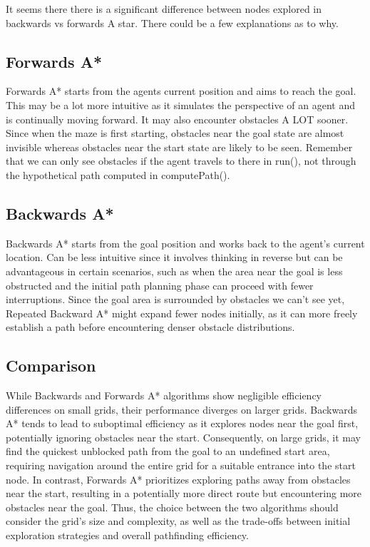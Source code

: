 \documentclass{article}
\begin{document}
It seems there there is a significant difference between nodes explored in backwards vs forwards A star. There could be a few explanations as to why. 
\subsection{Forwards A*}
Forwards A* starts from the agents current position and aims to reach the goal. This may be a lot more intuitive as it simulates the perspective of an agent and is continually moving forward. It may also encounter obstacles A LOT sooner. Since when the maze is first starting, obstacles near the goal state are almost invisible whereas obstacles near the start state are likely to be seen. Remember that we can only see obstacles if the agent travels to there in run(), not through the hypothetical path computed in computePath(). 

\subsection{Backwards A*}
Backwards A* starts from the goal position and works back to the agent's current location. Can be less intuitive since it involves thinking in reverse but can be advantageous in certain scenarios, such as when the area near the goal is less obstructed and the initial path planning phase can proceed with fewer interruptions. Since the goal area is surrounded by obstacles we can't see yet, Repeated Backward A* might expand fewer nodes initially, as it can more freely establish a path before encountering denser obstacle distributions. 

\subsection{Comparison}
While Backwards and Forwards A* algorithms show negligible efficiency differences on small grids, their performance diverges on larger grids. Backwards A* tends to lead to suboptimal efficiency as it explores nodes near the goal first, potentially ignoring obstacles near the start. Consequently, on large grids, it may find the quickest unblocked path from the goal to an undefined start area, requiring navigation around the entire grid for a suitable entrance into the start node. In contrast, Forwards A* prioritizes exploring paths away from obstacles near the start, resulting in a potentially more direct route but encountering more obstacles near the goal. Thus, the choice between the two algorithms should consider the grid's size and complexity, as well as the trade-offs between initial exploration strategies and overall pathfinding efficiency.
\end{document}

